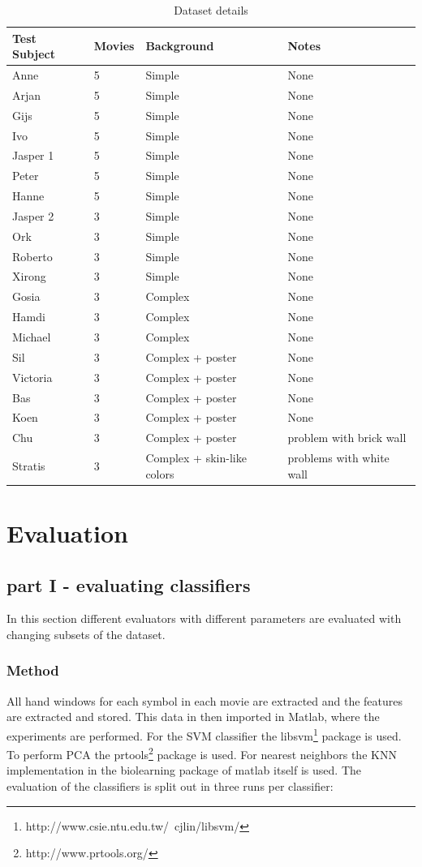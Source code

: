 \begin{table}
\centering
\begin{tabular}{llll}
\hline\hline
	Test Subject & Movies & Background & Notes \\
\hline
	Anne     & 5 & Simple & None \\
	Arjan    & 5 & Simple & None \\
	Gijs     & 5 & Simple & None \\
	Ivo      & 5 & Simple & None \\
	Jasper 1 & 5 & Simple & None \\
	Peter    & 5 & Simple & None \\
	Hanne    & 5 & Simple & None \\
	Jasper 2 & 3 & Simple & None \\
	Ork      & 3 & Simple & None \\
	Roberto  & 3 & Simple & None \\
	Xirong   & 3 & Simple & None \\
	Gosia    & 3 & Complex & None \\
	Hamdi    & 3 & Complex & None \\
	Michael  & 3 & Complex & None \\
	Sil      & 3 & Complex + poster & None \\
	Victoria & 3 & Complex + poster & None \\
	Bas      & 3 & Complex + poster & None \\
	Koen     & 3 & Complex + poster & None \\
	Chu      & 3 & Complex + poster & problem with brick wall \\
	Stratis  & 3 & Complex + skin-like colors & problems with white wall \\
\hline
\end{tabular}
\caption{Dataset details}
\end{table}

\section{Evaluation}

\subsection{part I - evaluating classifiers}
In this section different evaluators with different parameters are evaluated with changing subsets of the dataset.

\subsubsection{Method}
All hand windows for each symbol in each movie are extracted and the features are extracted and stored. This data in then imported in Matlab, where the experiments are performed. For the SVM classifier the libsvm\footnote{http://www.csie.ntu.edu.tw/~cjlin/libsvm/} package is used. To perform PCA the prtools\footnote{http://www.prtools.org/} package is used. For nearest neighbors the KNN implementation in the biolearning package of matlab itself is used. The evaluation of the classifiers is split out in three runs per classifier:

